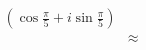 \documentclass[preview]{standalone}
\begin{document}
\begin{align*}
(\cos\frac{\pi}{5} + i\sin\frac{\pi}{5}) \\ &\approx
\end{align*}
\end{document}

